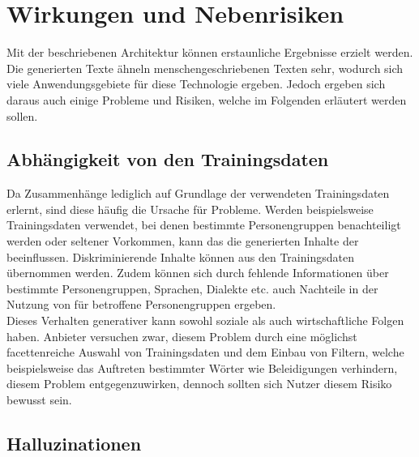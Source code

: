 \documentclass[../main.tex]{subfiles}
\begin{document}
\section{Wirkungen und Nebenrisiken}
Mit der beschriebenen Architektur können erstaunliche Ergebnisse erzielt werden. Die generierten Texte ähneln menschengeschriebenen Texten sehr, wodurch sich viele Anwendungsgebiete für diese Technologie ergeben. Jedoch ergeben sich daraus auch einige Probleme und Risiken, welche im Folgenden erläutert werden sollen. \\

\subsection{Abhängigkeit von den Trainingsdaten}

Da  Zusammenhänge lediglich auf Grundlage der verwendeten Trainingsdaten erlernt, sind diese häufig die Ursache für Probleme. Werden beispielsweise Trainingsdaten verwendet, 
bei denen bestimmte Personengruppen benachteiligt werden oder seltener Vorkommen, kann das die generierten Inhalte der  beeinflussen. Diskriminierende Inhalte können aus den Trainingsdaten 
übernommen werden. Zudem können sich durch fehlende Informationen über bestimmte Personengruppen, Sprachen, Dialekte etc. auch Nachteile in der Nutzung von  für betroffene 
Personengruppen ergeben.\\ Dieses Verhalten generativer  kann sowohl soziale als auch wirtschaftliche Folgen haben.  Anbieter versuchen zwar, diesem Problem durch eine möglichst 
facettenreiche Auswahl von Trainingsdaten und dem Einbau von Filtern, welche beispielsweise das Auftreten bestimmter Wörter wie Beleidigungen verhindern, diesem Problem entgegenzuwirken, 
dennoch sollten sich Nutzer diesem Risiko bewusst sein.\\

\subsection{Halluzinationen}
\end{document}
